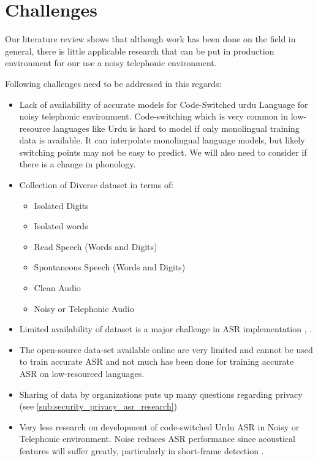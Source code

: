 \section{Challenges} %
\label{sec:challenges}

Our literature review shows that although work has been done on the field in general, there is little applicable research that can be put in production environment for our use a noisy telephonic environment. 

Following challenges need to be addressed in this regards:

\begin{itemize}
    \item Lack of availability of accurate models for Code-Switched urdu Language for noisy telephonic environment. Code-switching which is very common in low-resource languages like Urdu is hard to model if only monolingual training data is available. It can interpolate monolingual language models, but likely switching points may not be easy to predict. We will also need to consider if there is a change in phonology. 
    \item Collection of Diverse dataset in terms of:
    \begin{itemize}
    \item Isolated Digits
    \item Isolated words
    \item Read Speech (Words and Digits)
    \item Spontaneous Speech (Words and Digits)
    \item Clean Audio
    \item Noisy or Telephonic Audio
    \end{itemize}
    \item Limited availability of dataset is a major challenge in ASR implementation \cite{pironkov_hybrid-task_2020}, \cite{wang_wavenet_2020}. \item The open-source data-set available online are very limited and cannot be used to train accurate ASR and not much has been done for training accurate ASR on low-resourced languages.
    \item Sharing of data by organizations puts up many questions regarding privacy (see \ref{sub:security_privacy_asr_research})
    \item Very less research on development of code-switched Urdu ASR in Noisy or Telephonic environment. Noise reduces ASR performance \cite{lee_dnn-based_2016} since acoustical features will suffer greatly, particularly in short-frame detection \cite{ming_speech_2017}.

\end{itemize}
